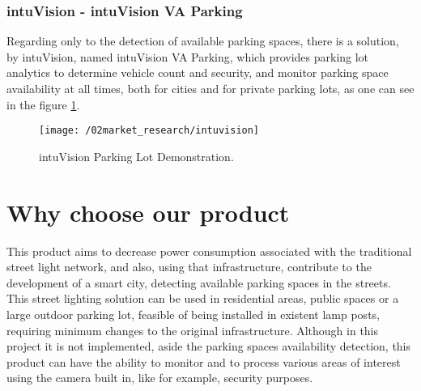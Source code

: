\subsubsection{intuVision - intuVision VA Parking}
Regarding only to the detection of available parking spaces, there is a solution, by intuVision, named intuVision VA Parking, which provides parking lot analytics to determine vehicle count and security, and monitor parking space availability at all times, both for cities and for private parking lots, as one can see in the figure \ref{fig:intuvision}.\cite{parking}

\begin{figure}[ht]
	\centering
	\texttt{[image: /02market\_research/intuvision]}
	\caption{intuVision Parking Lot Demonstration.}
	\label{fig:intuvision}
\end{figure}

\section{Why choose our product}
This product aims to decrease power consumption associated with the traditional street light network, and also, using that infrastructure, contribute to the development of a smart city, detecting available parking spaces in the streets. This street lighting solution can be used in residential areas, public spaces or a large outdoor parking lot, feasible of being installed in existent lamp posts, requiring minimum changes to the original infrastructure. Although in this project it is not implemented, aside the parking spaces availability detection, this product can have the ability to monitor and to process various areas of interest using the camera built in, like for example, security purposes.
